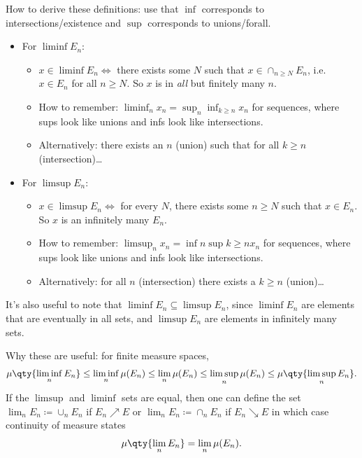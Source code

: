 \begin{remark}

How to derive these definitions: use that \(\inf\) corresponds to
intersections/existence and \(\sup\) corresponds to unions/forall.

\begin{itemize}
\tightlist
\item
  For \(\liminf E_n\):

  \begin{itemize}
  \tightlist
  \item
    \(x\in \liminf E_n \iff\) there exists some \(N\) such that
    \(x\in \cap_{n\geq N} E_n\), i.e.~\(x\in E_n\) for all \(n\geq N\).
    So \(x\) is in \emph{all} but finitely many \(n\).
  \item
    How to remember: \(\liminf_{n} x_n = \sup_{n} \inf_{k\geq n} x_n\)
    for sequences, where sups look like unions and infs look like
    intersections.
  \item
    Alternatively: there exists an \(n\) (union) such that for all
    \(k\geq n\) (intersection)\ldots{}
  \end{itemize}
\item
  For \(\limsup E_n\):

  \begin{itemize}
  \tightlist
  \item
    \(x\in \limsup E_n \iff\) for every \(N\), there exists some
    \(n\geq N\) such that \(x\in E_n\). So \(x\) is an infinitely many
    \(E_n\).
  \item
    How to remember: \(\limsup_{n} x_n = \inf{n} \sup{k\geq n} x_n\) for
    sequences, where sups look like unions and infs look like
    intersections.
  \item
    Alternatively: for all \(n\) (intersection) there exists a
    \(k\geq n\) (union)\ldots{}
  \end{itemize}
\end{itemize}

It's also useful to note that \(\liminf E_n \subseteq \limsup E_n\),
since \(\liminf E_n\) are elements that are eventually in all sets, and
\(\limsup E_n\) are elements in infinitely many sets.

Why these are useful: for finite measure spaces,
\begin{align*}
\mu\qty{\liminf_n E_n }\leq \liminf_n \mu(E_n) \leq \lim_n \mu(E_n) \leq \limsup_n \mu(E_n) \leq \mu\qty{\limsup_n E_n}
.\end{align*}
If the \(\limsup\) and \(\liminf\) sets are equal, then one can define
the set \(\lim_n E_n \coloneqq\cup_n E_n\) if \(E_n \nearrow E\) or
\(\lim_n E_n \coloneqq\cap_n E_n\) if \(E_n\searrow E\) in which case
continuity of measure states
\begin{align*}
\mu\qty{\lim_n E_n} = \lim_n \mu(E_n)
.\end{align*}

\end{remark}

